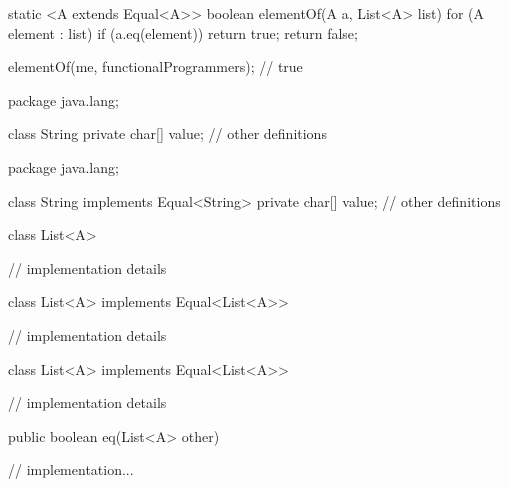 \documentclass[usenames,dvipsnames,svgnames,table,aspectratio=169,mathserif]{beamer}
\newcommand{\nl}{\vspace{\baselineskip}}
\newcommand{\pnl}{\pause \nl}
\begin{document}
\begin{frame}[fragile]
\begin{javacode}
static <A extends Equal<A>> boolean elementOf(A a, List<A> list) {
  for (A element : list) {
    if (a.eq(element)) return true;
  }
  return false;
}
\end{javacode}

\pnl

\begin{javacode}
elementOf(me, functionalProgrammers);
// true
\end{javacode}
\end{frame}


\begin{frame}[fragile]
\begin{javacode}
package java.lang;

class String {
  private char[] value;
  // other definitions
}
\end{javacode}
\end{frame}


\begin{frame}[fragile]
\begin{javacode}
package java.lang;

class String implements Equal<String> {
  private char[] value;
  // other definitions
}
\end{javacode}
\end{frame}


\begin{frame}[fragile]
\begin{javacode}
class List<A> {
  // implementation details





}
\end{javacode}
\end{frame}


\begin{frame}[fragile]
\begin{javacode}
class List<A> implements Equal<List<A>> {
  // implementation details





}
\end{javacode}
\end{frame}


\begin{frame}[fragile]
\begin{javacode}
class List<A> implements Equal<List<A>> {
  // implementation details

  public boolean eq(List<A> other) {
    // implementation...

  }
}
\end{javacode}
\end{frame}
\end{document}
